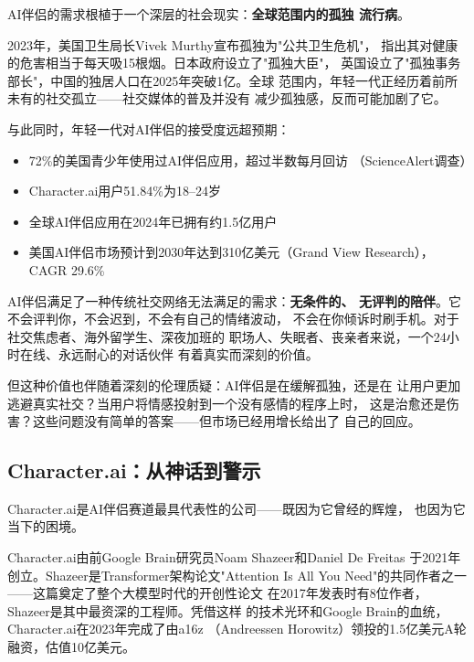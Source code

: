 \begin{whybox}[为什么AI伴侣是一个争议但真实的市场]
AI伴侣的需求根植于一个深层的社会现实：\textbf{全球范围内的孤独
流行病}。

2023年，美国卫生局长Vivek Murthy宣布孤独为"公共卫生危机"，
指出其对健康的危害相当于每天吸15根烟。日本政府设立了"孤独大臣"，
英国设立了"孤独事务部长"，中国的独居人口在2025年突破1亿。全球
范围内，年轻一代正经历着前所未有的社交孤立——社交媒体的普及并没有
减少孤独感，反而可能加剧了它。

与此同时，年轻一代对AI伴侣的接受度远超预期：

\begin{itemize}
  \item 72\%的美国青少年使用过AI伴侣应用，超过半数每月回访
    （ScienceAlert调查）
  \item Character.ai用户51.84\%为18--24岁
  \item 全球AI伴侣应用在2024年已拥有约1.5亿用户
  \item 美国AI伴侣市场预计到2030年达到310亿美元（Grand View
    Research），CAGR 29.6\%
\end{itemize}

AI伴侣满足了一种传统社交网络无法满足的需求：\textbf{无条件的、
无评判的陪伴}。它不会评判你，不会迟到，不会有自己的情绪波动，
不会在你倾诉时刷手机。对于社交焦虑者、海外留学生、深夜加班的
职场人、失眠者、丧亲者来说，一个24小时在线、永远耐心的对话伙伴
有着真实而深刻的价值。

但这种价值也伴随着深刻的伦理质疑：AI伴侣是在缓解孤独，还是在
让用户更加逃避真实社交？当用户将情感投射到一个没有感情的程序上时，
这是治愈还是伤害？这些问题没有简单的答案——但市场已经用增长给出了
自己的回应。
\end{whybox}

\subsection{Character.ai：从神话到警示}
\label{subsec:character-ai}

Character.ai是AI伴侣赛道最具代表性的公司——既因为它曾经的辉煌，
也因为它当下的困境。

Character.ai由前Google Brain研究员Noam Shazeer和Daniel De Freitas
于2021年创立。Shazeer是Transformer架构论文"Attention Is All You
Need"的共同作者之一——这篇奠定了整个大模型时代的开创性论文
在2017年发表时有8位作者，Shazeer是其中最资深的工程师。凭借这样
的技术光环和Google Brain的血统，Character.ai在2023年完成了由a16z
（Andreessen Horowitz）领投的1.5亿美元A轮融资，估值10亿美元。

